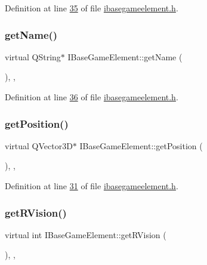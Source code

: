 Definition at line \hyperlink{a00047_source_l00035}{35} of file \hyperlink{a00047_source}{ibasegameelement.\+h}.

\mbox{\label{a00137_a01051b9a502128a82f9a168a14d1ecdc}} 
\subsubsection{\texorpdfstring{get\+Name()}{getName()}}
{\footnotesize\ttfamily virtual Q\+String$\ast$ I\+Base\+Game\+Element\+::get\+Name (\begin{DoxyParamCaption}{ }\end{DoxyParamCaption})\hspace{0.3cm}{\ttfamily [inline]}, {\ttfamily [virtual]}, {\ttfamily [inherited]}}



Definition at line \hyperlink{a00047_source_l00036}{36} of file \hyperlink{a00047_source}{ibasegameelement.\+h}.

\mbox{\label{a00137_a3159c02c1118989e3476b52d89a52401}} 
\subsubsection{\texorpdfstring{get\+Position()}{getPosition()}}
{\footnotesize\ttfamily virtual Q\+Vector3D$\ast$ I\+Base\+Game\+Element\+::get\+Position (\begin{DoxyParamCaption}{ }\end{DoxyParamCaption})\hspace{0.3cm}{\ttfamily [inline]}, {\ttfamily [virtual]}, {\ttfamily [inherited]}}



Definition at line \hyperlink{a00047_source_l00031}{31} of file \hyperlink{a00047_source}{ibasegameelement.\+h}.

\mbox{\label{a00137_a4437ee7dcdb6e3e3c58c8b00d8bb0500}} 
\subsubsection{\texorpdfstring{get\+R\+Vision()}{getRVision()}}
{\footnotesize\ttfamily virtual int I\+Base\+Game\+Element\+::get\+R\+Vision (\begin{DoxyParamCaption}{ }\end{DoxyParamCaption})\hspace{0.3cm}{\ttfamily [inline]}, {\ttfamily [virtual]}, {\ttfamily [inherited]}}



